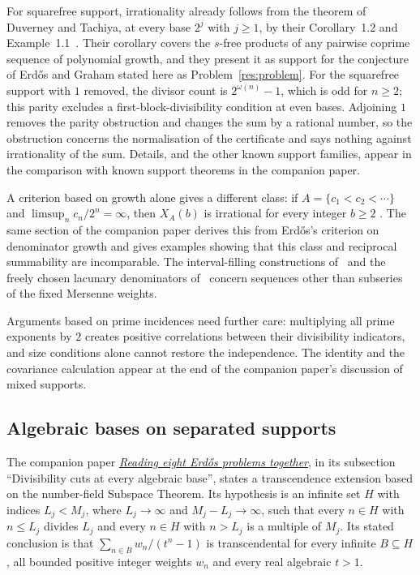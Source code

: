 \documentclass[11pt]{article}
\begin{document}
For squarefree support, irrationality already follows from the theorem
of Duverney and Tachiya, at every base $2^j$ with $j\ge1$, by their
Corollary~1.2 and Example~1.1~\cite[p.~4]{duverneytachiya}. Their
corollary covers the $s$-free products of any pairwise coprime sequence
of polynomial growth, and they present it as support for the
conjecture of Erd\H{o}s and Graham stated here as
Problem~\ref{res:problem}. For the squarefree support with $1$ removed,
the divisor count is $2^{\omega(n)}-1$, which is odd for $n\ge2$; this
parity excludes a first-block-divisibility condition at even bases.
Adjoining $1$ removes the parity obstruction and changes the sum by a
rational number, so the obstruction concerns the normalisation of the
certificate and says nothing against irrationality of the sum. Details,
and the other known support families, appear in
{the comparison with known support theorems in the companion paper}.

A criterion based on growth alone gives a different class: if
$A=\{c_1<c_2<\cdots\}$ and $\limsup_n c_n/2^n=\infty$, then $X_A(b)$
is irrational for every integer $b\ge2$ \cite[Theorem~1]{erdos1975}.
The same section of the companion paper derives this from Erd\H{o}s's
criterion on denominator growth and gives examples showing that this
class and reciprocal summability are incomparable. The interval-filling
constructions of~\cite{bkkkz2026} and the freely chosen lacunary
denominators of~\cite{vandoornkovac} concern sequences other than
subseries of the fixed Mersenne weights.

Arguments based on prime incidences need further care: multiplying all
prime exponents by $2$ creates positive correlations between their
divisibility indicators, and size conditions alone cannot restore the
independence. The identity and the covariance calculation appear at the
end of
{the companion paper's discussion of mixed supports}.

\subsection{Algebraic bases on separated supports}
\label{sec:separated-support-transfer}
The companion paper
\href{optimal-sparse-perturbations.pdf}{\emph{Reading eight Erd\H{o}s
problems together}}, in its subsection ``Divisibility cuts at every
algebraic base'', states a transcendence extension based on the
number-field Subspace Theorem. Its hypothesis is an infinite set $H$
with indices $L_j<M_j$, where $L_j\to\infty$ and $M_j-L_j\to\infty$,
such that every $n\in H$ with $n\le L_j$ divides $L_j$ and every
$n\in H$ with $n>L_j$ is a multiple of $M_j$. Its stated conclusion is
that $\sum_{n\in B}w_n/(t^n-1)$ is transcendental for every infinite
$B\subseteq H$, all bounded positive integer weights $w_n$ and every
real algebraic $t>1$.
\end{document}
